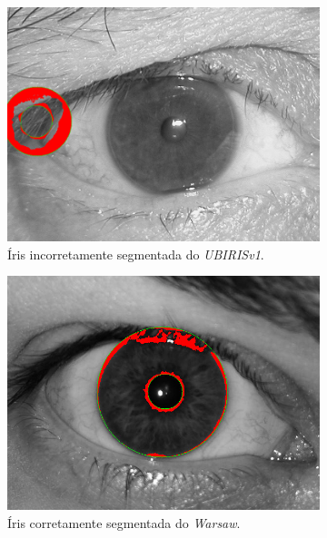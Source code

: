 \begin{figure}[H]
\medskip
\begin{subfigure}{0.25\textwidth}
  \includegraphics[width=\linewidth]{img/Resultados/ubirisv1/ubirisv1_seg_ruim.jpg}
  \caption{Íris incorretamente segmentada do \textit{UBIRISv1}.}
\end{subfigure}\hfil %
\begin{subfigure}{0.25\textwidth}
  \includegraphics[width=\linewidth]{img/Resultados/warsaw/warsaw_seg_boa.jpg}
  \caption{Íris corretamente segmentada do \textit{\acrshort{Warsaw}}.}
\end{subfigure}\hfil %
\begin{subfigure}{0.25\textwidth}

\end{subfigure}
\end{figure}
